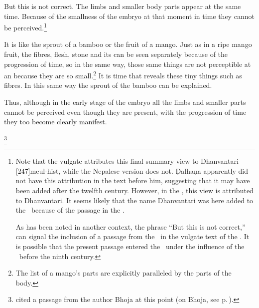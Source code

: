 \begin{translation}
    But this is not correct.  The limbs and smaller body parts appear
at the same time.  Because of the smallness of the embryo at that
moment in time they cannot be perceived.\footnote{Note that the
    vulgate attributes this final summary view to Dhanvantari 
    [247]{meul-hist}, while the Nepalese
    version does not. Ḍalhaṇa apparently did not have this attribution
    in the text before him, suggesting that it may have been added
    after the twelfth century.  However, in the \CS, this view is attributed to 
    Dhanvantari.  It seems likely that the name Dhanvantari was here added to 
    the \SS\ because of the passage in the \CS.
    
    As has been noted in another context, the phrase  
    “But this is not correct,” can signal the inclusion of a passage from the \CS\ in 
    the vulgate text of the \SS \citep{wuja-2025}.  It is possible that the present 
    passage entered the \SS\ under the influence of the \CS\ before the ninth 
    century.}
        
        It is like the sprout of a bamboo or the fruit of a mango.
Just as in a ripe mango fruit, the fibres, flesh, stone and
its  can be seen separately because of the
progression of time, so in the same way, those same things are
not perceptible at an  because they
are so small.\footnote{The list of a mango's parts are
    explicitly paralleled by the parts of the body.} It is time
    that reveals these tiny things such as fibres. In this same
    way the sprout of the bamboo can be explained.
    
    Thus, although in the early stage of the embryo all the limbs and 
    smaller parts cannot be perceived even though they 
    are present, 
    with the progression of time they too become clearly manifest. 
    


    
\footnote{ cited a passage from the author Bhoja
    at this point (on Bhoja, see p.\,\pageref{Bhoja}).}





\bigskip


    
\end{translation}
